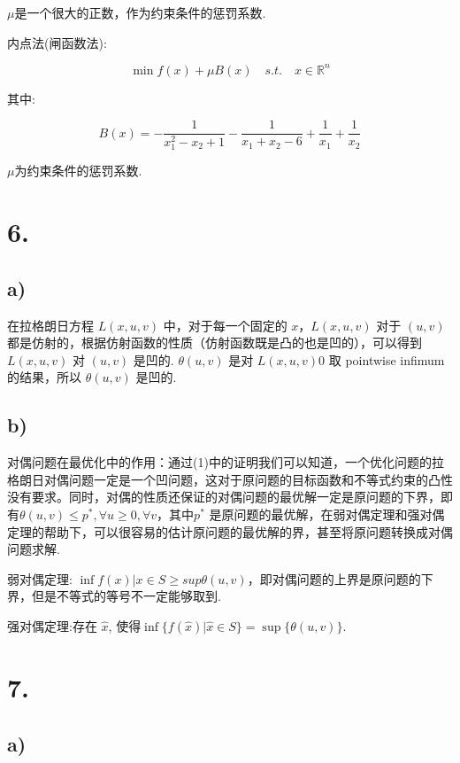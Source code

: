 \documentclass{article}
\begin{document}
	$\mu$是一个很大的正数，作为约束条件的惩罚系数.

	内点法(闸函数法):

	\[\min f(x) + \mu B(x) \quad s.t. \quad x \in \mathbb{R}^n\]

	其中:

	\[B(x) = -\frac{1}{x_1^2-x_2 + 1} - \frac{1}{x_1 + x_2 - 6}+ \frac{1}{x_1}+\frac{1}{x_2}\]

	$\mu$为约束条件的惩罚系数.

	\section*{6.}

	\subsection*{a)}

	在拉格朗日方程 $L(x,u,v)$ 中，对于每一个固定的 $x$，$L(x,u,v)$ 对于 $(u,v)$ 都是仿射的，根据仿射函数的性质（仿射函数既是凸的也是凹的），可以得到$L(x,u,v)$ 对 $(u,v)$ 是凹的.
	$\theta(u,v)$ 是对 $L(x,u,v)0$ 取 pointwise infimum 的结果，所以 $\theta(u,v)$ 是凹的.

	\subsection*{b)}

	对偶问题在最优化中的作用：通过(1)中的证明我们可以知道，一个优化问题的拉格朗日对偶问题一定是一个凹问题，这对于原问题的目标函数和不等式约束的凸性没有要求。同时，对偶的性质还保证的对偶问题的最优解一定是原问题的下界，即有$\theta(u,v)\leq p^*,\forall u\geq0, \forall v$，其中$p^*$ 是原问题的最优解，在弱对偶定理和强对偶定理的帮助下，可以很容易的估计原问题的最优解的界，甚至将原问题转换成对偶问题求解.

	弱对偶定理: $\inf{f(x)|x \in S} \geq sup{\theta(u,v)}$，即对偶问题的上界是原问题的下界，但是不等式的等号不一定能够取到.

	强对偶定理:存在 $ \hat{x}$, 使得$\inf\{f( \hat{x})| \hat{x} \in S\} = \sup\{\theta(u,v)\}$.

	\section*{7.}

	\subsection*{a)}
\end{document}

